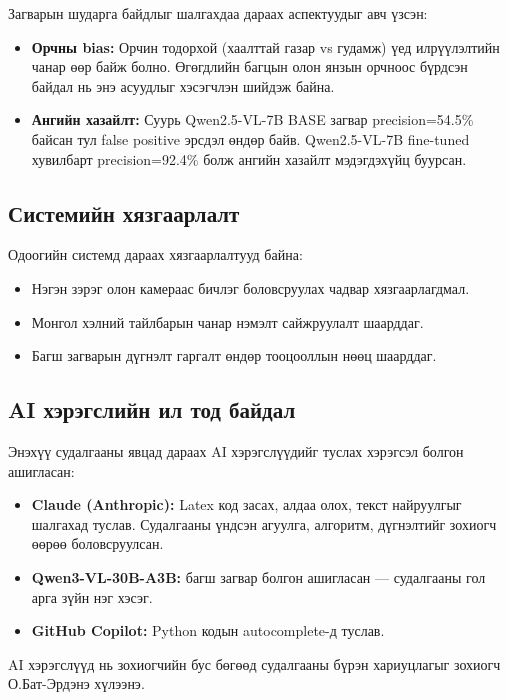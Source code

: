 Загварын шударга байдлыг шалгахдаа дараах аспектуудыг авч үзсэн:

\begin{itemize}
    \item \textbf{Орчны bias:} Орчин тодорхой (хаалттай газар vs гудамж) үед илрүүлэлтийн чанар өөр байж болно. Өгөгдлийн багцын олон янзын орчноос бүрдсэн байдал нь энэ асуудлыг хэсэгчлэн шийдэж байна.
    \item \textbf{Ангийн хазайлт:} Суурь Qwen2.5-VL-7B BASE загвар precision=54.5\% байсан тул false positive эрсдэл өндөр байв. Qwen2.5-VL-7B fine-tuned хувилбарт precision=92.4\% болж ангийн хазайлт мэдэгдэхүйц буурсан.
\end{itemize}

\subsection{Системийн хязгаарлалт}

Одоогийн системд дараах хязгаарлалтууд байна:

\begin{itemize}
    \item Нэгэн зэрэг олон камераас бичлэг боловсруулах чадвар хязгаарлагдмал.
    \item Монгол хэлний тайлбарын чанар нэмэлт сайжруулалт шаарддаг.
    \item Багш загварын дүгнэлт гаргалт өндөр тооцооллын нөөц шаарддаг.
\end{itemize}

\subsection{AI хэрэгслийн ил тод байдал}

Энэхүү судалгааны явцад дараах AI хэрэгслүүдийг туслах хэрэгсэл болгон ашигласан:

\begin{itemize}
    \item \textbf{Claude (Anthropic):} Latex код засах, алдаа олох, текст найруулгыг шалгахад туслав. Судалгааны үндсэн агуулга, алгоритм, дүгнэлтийг зохиогч өөрөө боловсруулсан.
    \item \textbf{Qwen3-VL-30B-A3B:} багш загвар болгон ашигласан --- судалгааны гол арга зүйн нэг хэсэг.
    \item \textbf{GitHub Copilot:} Python кодын autocomplete-д туслав.
\end{itemize}

AI хэрэгслүүд нь зохиогчийн бус бөгөөд судалгааны бүрэн хариуцлагыг зохиогч О.Бат-Эрдэнэ хүлээнэ.

